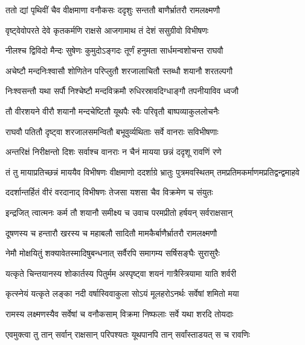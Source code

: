 
\twolineshloka
{ततो द्यां पृथिवीं चैव वीक्षमाणा वनौकसः}
{ददृशुः सन्ततौ बाणैर्भ्रातरौ रामलक्ष्मणौ} %

\twolineshloka
{वृष्ट्वेवोपरते देवे कृतकर्मणि राक्षसे}
{आजगामाथ तं देशं ससुग्रीवो विभीषणः} %

\twolineshloka
{नीलश्च द्विविदो मैन्दः सुषेणः कुमुदोऽङ्गदः}
{तूर्णं हनुमता सार्धमन्वशोचन्त राघवौ} %

\twolineshloka
{अचेष्टौ मन्दनिःश्वासौ शोणितेन परिप्लुतौ}
{शरजालाचितौ स्तब्धौ शयानौ शरतल्पगौ} %

\twolineshloka
{निःश्वसन्तौ यथा सर्पौ निश्चेष्टौ मन्दविक्रमौ}
{रुधिरस्रावदिग्धाङ्गौ तपनीयाविव ध्वजौ} %

\twolineshloka
{तौ वीरशयने वीरौ शयानौ मन्दचेष्टितौ}
{यूथपैः स्वैः परिवृतौ बाष्पव्याकुललोचनैः} %

\twolineshloka
{राघवौ पतितौ दृष्ट्वा शरजालसमन्वितौ}
{बभूवुर्व्यथिताः सर्वे वानराः सविभीषणाः} %

\twolineshloka
{अन्तरिक्षं निरीक्षन्तो दिशः सर्वाश्च वानराः}
{न चैनं मायया छन्नं ददृशू रावणिं रणे} %

\threelineshloka
{तं तु मायाप्रतिच्छन्नं माययैव विभीषणः}
{वीक्षमाणो ददर्शाग्रे भ्रातुः पुत्रमवस्थितम्}
{तमप्रतिमकर्माणमप्रतिद्वन्द्वमाहवे} %

\twolineshloka
{ददर्शान्तर्हितं वीरं वरदानाद् विभीषणः}
{तेजसा यशसा चैव विक्रमेण च संयुतः} %

\twolineshloka
{इन्द्रजित् त्वात्मनः कर्म तौ शयानौ समीक्ष्य च}
{उवाच परमप्रीतो हर्षयन् सर्वराक्षसान्} %

\twolineshloka
{दूषणस्य च हन्तारौ खरस्य च महाबलौ}
{सादितौ मामकैर्बाणैर्भ्रातरौ रामलक्ष्मणौ} %

\twolineshloka
{नेमौ मोक्षयितुं शक्यावेतस्मादिषुबन्धनात्}
{सर्वैरपि समागम्य सर्षिसङ्घैः सुरासुरैः} %

\twolineshloka
{यत्कृते चिन्तयानस्य शोकार्तस्य पितुर्मम}
{अस्पृष्ट्वा शयनं गात्रैस्त्रियामा याति शर्वरी} %

\twolineshloka
{कृत्स्नेयं यत्कृते लङ्का नदी वर्षास्विवाकुला}
{सोऽयं मूलहरोऽनर्थः सर्वेषां शमितो मया} %

\twolineshloka
{रामस्य लक्ष्मणस्यैव सर्वेषां च वनौकसाम्}
{विक्रमा निष्फलाः सर्वे यथा शरदि तोयदाः} %

\twolineshloka
{एवमुक्त्वा तु तान् सर्वान् राक्षसान् परिपश्यतः}
{यूथपानपि तान् सर्वांस्ताडयत् स च रावणिः} %

